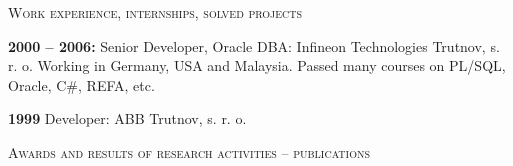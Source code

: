 \documentclass[10pt]{article}
\begin{document}
\begin{cv}
\begin{cvlist}{\large \textsc{Work experience, internships, solved projects}}
\item {\bf{2000 -- 2006:}} Senior Developer, Oracle DBA: Infineon
  Technologies Trutnov, s. r. o. Working in Germany, USA and
  Malaysia. Passed many courses on PL/SQL, Oracle, C\#, REFA, etc.

\item {\bf{1999}} Developer: ABB Trutnov, s. r. o.




\end{cvlist}




\noindent\hrulefill
\begin{cvlist}{\large \textsc{Awards and results of research activities -- publications}}







\end{cvlist}
\end{cv}
\end{document}
